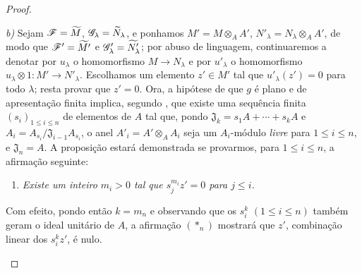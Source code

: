 \begin{proof}
\begin{enumerate}[label=(\roman*)]
  \emph{b)} Sejam
  $\mathscr{F}=\widetilde M$,
  $\mathscr{G}_\lambda=
  \widetilde N_\lambda$,
  e ponhamos
  $M'=M\otimes_A A'$,
  $N'_\lambda=
  N_\lambda\otimes_A A'$,
  de modo que
  $\mathscr{F}'=\widetilde{M'}$
  e
  $\mathscr{G}'_\lambda=
  \widetilde{N'_\lambda}$;
  por abuso de linguagem,
  continuaremos a denotar
  por $u_\lambda$ o
  homomorfismo
  $M\to N_\lambda$
  e por $u'_\lambda$
  o homomorfismo
  $u_\lambda\otimes1:
  M'\to N'_\lambda$.
  Escolhamos um elemento
  $z'\in M'$ tal que
  $u'_\lambda(z')=0$
  para todo $\lambda$;
  resta provar que
  $z'=0$. Ora, a hipótese
  de que $g$ é plano e
  de apresentação finita
  implica, segundo
  ,
  que existe uma sequência
  finita
  $(s_i)_{1\leq i\leq n}$
  de elementos de $A$
  tal que, pondo
  $\mathfrak J_k=
  s_1A+\cdots+s_kA$
  e
  $A_i=A_{s_i}/
  \mathfrak J_{i-1}A_{s_i}$,
  o anel
  $A'_i=A'\otimes_A A_i$
  seja um $A_i$-módulo
  \emph{livre} para
  $1\leq i\leq n$,
  e $\mathfrak J_n=A$.
  A proposição estará
  demonstrada se provarmos,
  para $1\leq i\leq n$,
  a afirmação seguinte:
  \begin{enumerate}[label=$(*_i)$]
    \item \emph{Existe um
    inteiro $m_i>0$ tal
    que $s_j^{m_i}z'=0$
    para $j\leq i$.}
  \end{enumerate}
  Com efeito, pondo então
  $k=m_n$ e observando
  que os $s_i^k$
  $(1\leq i\leq n)$
  também geram o ideal
  unitário de $A$, a
  afirmação $(*_n)$
  mostrará que $z'$,
  combinação linear
  dos $s_i^kz'$, é nulo.


\end{enumerate}
\end{proof}

